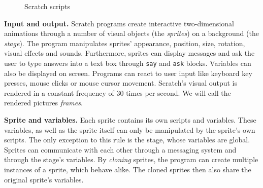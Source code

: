 \begin{figure}[htpb]
    \centering
    \caption{Scratch scripts}
    \label{fig:scratch_code}
\end{figure}

\textbf{Input and output.}
Scratch programs create interactive two-dimensional animations through a number of visual objects (the \textit{sprites}) on a background (the \textit{stage}).
The program manipulates sprites' appearance, position, size, rotation, visual effects and sounds.
Furthermore, sprites can display messages and ask the user to type answers into a text box through \texttt{say} and \texttt{ask} blocks.
Variables can also be displayed on screen.
Programs can react to user input like keyboard key presses, mouse clicks or mouse cursor movement.
Scratch's visual output is rendered in a constant frequency of 30 times per second.
We will call the rendered pictures \textit{frames}.
\parspace

\textbf{Sprite and variables.}
Each sprite contains its own scripts and variables.
These variables, as well as the sprite itself can only be manipulated by the sprite's own scripts.
The only exception to this rule is the stage, whose variables are global.
Sprites can communicate with each other through a messaging system and through the stage's variables.
By \textit{cloning} sprites, the program can create multiple instances of a sprite, which behave alike.
The cloned sprites then also share the original sprite's variables.
\parspace

